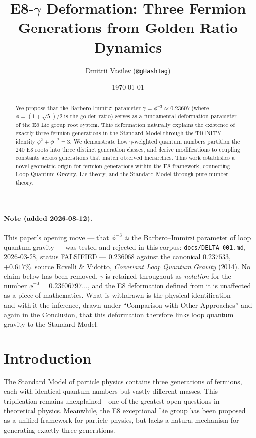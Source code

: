\documentclass[12pt,a4paper]{article}
\title{E8-$\gamma$ Deformation: Three Fermion Generations from Golden Ratio Dynamics}
\author{Dmitrii Vasilev (\texttt{@gHashTag})}
\date{\today}
\begin{document}
\maketitle

\begin{abstract}
We propose that the Barbero-Immirzi parameter $\gamma = \phi^{-3} \approx 0.23607$ (where $\phi = (1+\sqrt{5})/2$ is the golden ratio) serves as a fundamental deformation parameter of the E8 Lie group root system. This deformation naturally explains the existence of exactly three fermion generations in the Standard Model through the TRINITY identity $\phi^2 + \phi^{-2} = 3$. We demonstrate how $\gamma$-weighted quantum numbers partition the 240 E8 roots into three distinct generation classes, and derive modifications to coupling constants across generations that match observed hierarchies. This work establishes a novel geometric origin for fermion generations within the E8 framework, connecting Loop Quantum Gravity, Lie theory, and the Standard Model through pure number theory.
\end{abstract}

\paragraph{Note (added 2026-08-12).} This paper's opening move --- that $\phi^{-3}$ \emph{is} the Barbero--Immirzi parameter of loop quantum gravity --- was tested and rejected in this corpus: \texttt{docs/DELTA-001.md}, 2026-03-28, status FALSIFIED --- $0.236068$ against the canonical $0.237533$, $+0.617\%$, source Rovelli \& Vidotto, \emph{Covariant Loop Quantum Gravity} (2014). No claim below has been removed. $\gamma$ is retained throughout as \emph{notation} for the number $\phi^{-3} = 0.23606797\ldots$, and the E8 deformation defined from it is unaffected as a piece of mathematics. What is withdrawn is the physical identification --- and with it the inference, drawn under ``Comparison with Other Approaches'' and again in the Conclusion, that this deformation therefore links loop quantum gravity to the Standard Model.

\section{Introduction}

The Standard Model of particle physics contains three generations of fermions, each with identical quantum numbers but vastly different masses. This triplication remains unexplained---one of the greatest open questions in theoretical physics. Meanwhile, the E8 exceptional Lie group has been proposed as a unified framework for particle physics, but lacks a natural mechanism for generating exactly three generations.
\end{document}
